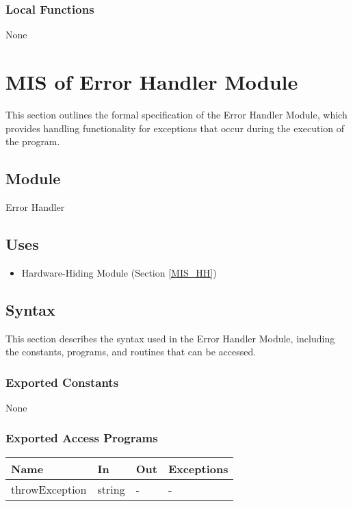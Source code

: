 \documentclass[12pt, titlepage]{article}
\begin{document}
\subsubsection{Local Functions}

None

\newpage

\section{MIS of Error Handler Module} \label{MIS_ERROR}

This section outlines the formal specification of the Error Handler Module,
which provides handling functionality for exceptions that occur during the
execution of the program.

\subsection{Module}

Error Handler

\subsection{Uses}

\begin{itemize}
\item Hardware-Hiding Module (Section \ref{MIS_HH})
\end{itemize}

\subsection{Syntax}

This section describes the syntax used in the Error Handler Module, including
the constants, programs, and routines that can be accessed.

\subsubsection{Exported Constants}

None

\subsubsection{Exported Access Programs}

\begin{center}
\begin{tabular}{p{3cm} p{4cm} p{4cm} p{2cm}}
\hline
\textbf{Name} & \textbf{In} & \textbf{Out} & \textbf{Exceptions} \\
\hline
throwException & string & - & - \\
\hline
\end{tabular}
\end{center}
\end{document}
